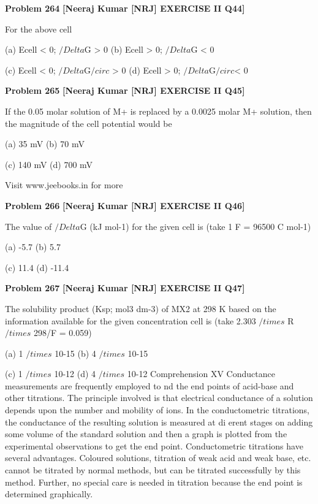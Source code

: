 \begin{problembox}
\textbf{Problem 264} \hfill \textbf{[Neeraj Kumar [NRJ] EXERCISE II Q44]}
\label{q:ext-nrj_all_questions-264}

For the above cell
 
 (a) Ecell < 0; $/Delta$G > 0 
(b) Ecell > 0; $/Delta$G < 0
 
 (c) Ecell < 0; $/Delta$G$/circ$ > 0 
(d) Ecell > 0; $/Delta$G$/circ$< 0
\end{problembox}

\begin{problembox}
\textbf{Problem 265} \hfill \textbf{[Neeraj Kumar [NRJ] EXERCISE II Q45]}
\label{q:ext-nrj_all_questions-265}

If the 0.05 molar solution of M+ is replaced by a 
0.0025 molar M+ solution, then the magnitude of 
the cell potential would be
 
 (a) 35 mV 
(b) 70 mV
 
 (c) 140 mV 
(d) 700 mV
 
 
Visit www.jeebooks.in for more
\end{problembox}

\begin{problembox}
\textbf{Problem 266} \hfill \textbf{[Neeraj Kumar [NRJ] EXERCISE II Q46]}
\label{q:ext-nrj_all_questions-266}

The value of $/Delta$G (kJ mol-1) for the given cell is 
(take 1 F = 96500 C mol-1)
 
 (a) -5.7 
(b) 5.7
 
 (c) 11.4 
(d) -11.4
\end{problembox}

\begin{problembox}
\textbf{Problem 267} \hfill \textbf{[Neeraj Kumar [NRJ] EXERCISE II Q47]}
\label{q:ext-nrj_all_questions-267}

The solubility product (Ksp; mol3 dm-3) of MX2 
at 298 K based on the information available for 
the given concentration cell is (take 2.303 $/times$ R $/times$ 
298/F = 0.059)
 
 (a) 1 $/times$ 10-15 
(b) 4 $/times$ 10-15
 
 (c) 1 $/times$ 10-12 
(d) 4 $/times$ 10-12
Comprehension XV
Conductance measurements are frequently employed to   nd the end points of acid-base and other titrations. The 
principle involved is that electrical conductance of a solution depends upon the number and mobility of ions. In the 
conductometric titrations, the conductance of the resulting solution is measured at di  erent stages on adding some 
volume of the standard solution and then a graph is plotted from the experimental observations to get the end point. 
Conductometric titrations have several advantages. Coloured solutions, titration of weak acid and weak base, etc. 
cannot be titrated by normal methods, but can be titrated successfully by this method. Further, no special care is needed 
in titration because the end point is determined graphically.
\end{problembox}

